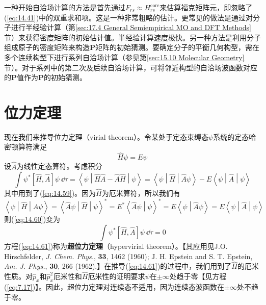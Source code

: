     一种开始自洽场计算的方法是首先通过$F_{rs} \approx H^{\text{core}}_{rs}$来估算福克矩阵元，即忽略了(\ref{eq:14.41})中的双重求和项。这是一种非常粗略的估计。更常见的做法是通过对分子进行半经验计算（第\ref{sec:17.4 General Semiempirical MO and DFT Methods}节）来获得密度矩阵的初始估计值。半经验计算速度极快。另一种方法是利用分子组成原子的密度矩阵来构造$\mathbf{P}$矩阵的初始猜测。要确定分子的平衡几何构型，需在多个连续构型下进行系列自洽场计算（参见第\ref{sec:15.10 Molecular Geometry}节）。对于系列中的第二次及后续自洽场计算，可将邻近构型的自洽场波函数对应的$\mathbf{P}$值作为$\mathbf{P}$的初始猜测。

\section{位力定理}
\label{sec:14.4 The Virial Theorem}

    现在我们来推导位力定理（virial theorem）。令某处于定态束缚态$\psi$系统的定态哈密顿算符满足
    \begin{equation}
        \hat H \psi = E \psi
        \label{eq:14.59}
    \end{equation}
    设$\hat{A}$为线性定态算符。考虑积分
    \begin{equation}
        \int \psi^* \left[\hat{H}, \hat{A}\right] \psi\:\dd \tau = \left\langle \psi \middle| \hat{H}\hat{A} - \hat{A}\hat{H} \middle| \psi \right\rangle = \left\langle \psi \middle| \hat{H} \middle| \hat{A} \psi \right\rangle - E \left\langle \psi \middle| \hat{A} \middle| \psi \right\rangle
        \label{eq:14.60}
    \end{equation}
    其中用到了(\ref{eq:14.59})。因为$\hat{H}$为厄米算符，所以我们有
    \begin{equation*}
        \left\langle \psi \middle| \hat{H} \middle| \hat{A} \psi \right\rangle = \left\langle \hat{A} \psi \middle| \hat{H} \middle| \psi \right\rangle^* = E^* \left\langle \hat{A} \psi \middle| \psi \right\rangle^* = E \left\langle \psi \middle| \hat{A} \psi \right\rangle = E \left\langle \psi \middle| \hat{A} \middle| \psi \right\rangle
    \end{equation*}
    则(\ref{eq:14.60})变为
    \begin{equation}
        \int \psi^* \left[\hat{H}, \hat{A}\right] \psi\:\dd \tau = 0
        \label{eq:14.61}
    \end{equation}
    方程(\ref{eq:14.61})称为\textbf{超位力定理}（hypervirial theorem）。【其应用见J.O. Hirschfelder, \textit{J. Chem. Phys.}, \textbf{33}, 1462 (1960); J. H. Epstein and S. T. Epstein, \textit{Am. J. Phys.}, \textbf{30}, 266 (1962).】在推导(\ref{eq:14.61})的过程中，我们用到了$\hat{H}$的厄米性质。对$\hat{p}_x$和$\hat{p}_x^2$厄米性和$\hat{H}$厄米性的证明要求$\psi$在$\pm \infty$处趋于零【见方程(\ref{eq:7.17})】。因此，超位力定理对连续态不适用，因为连续态波函数在$\pm \infty$处不趋于零。

